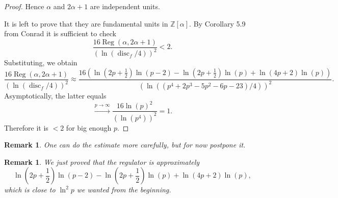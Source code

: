 \documentclass[a4paper]{article}
\newtheorem{Rem}[Thm]{Remark}
\DeclareMathOperator{\Reg}{Reg}        %
\DeclareMathOperator{\disc}{disc}        %
\begin{document}
\begin{proof}
Hence $\alpha$ and $2\alpha + 1$ are independent units. 

It is left to prove that they are fundamental units in $\mathbb{Z}[\alpha]$.
By Corollary 5.9 from Conrad it is sufficient to check
\[
\frac{16 \Reg(\alpha, 2\alpha + 1) }
{(\ln(\disc_f/4))^2} 
< 2
.\] 
Substituting, we obtain
\[
\frac{16 \Reg(\alpha, 2\alpha + 1) }
{(\ln(\disc_f/4))^2} 
\approx
\frac{16 (
\ln(2 p + \frac{1}{2}) \ln(p - 2) - \ln(2 p + \frac{1}{2}) \ln(p) + \ln(4p + 2) \ln(p)
) }
{(\ln(
(p^4 + 2 p^3 - 5 p^2 - 6 p - 23)
/4))^2} 
.\] 
Asymptotically, the latter equals
\[
\stackrel{p \to \infty}{\longrightarrow}
\frac{16 
\ln(p)^2
}
{(\ln(
p^4 ))^2} = 1
.\] 
Therefore it is $< 2$ for big enough $p$.
\end{proof}
\begin{Rem}
One can do the estimate more carefully, but for now postpone it. 
\end{Rem}
\begin{Rem}
We just proved that the regulator is approximately 
\[
\ln(2 p + \frac{1}{2}) \ln(p - 2) - \ln(2 p + \frac{1}{2}) \ln(p) + \ln(4p + 2) \ln(p)
,\] 
which is close to $\ln^2 p$ we wanted from the beginning.
\end{Rem}
\end{document}
